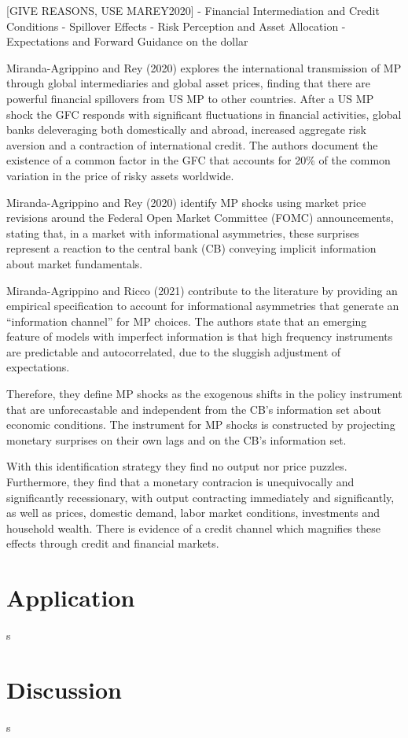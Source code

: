 \documentclass[10pt,a4paper,draft]{article}
\begin{document}
[GIVE REASONS, USE MAREY2020] 
- Financial Intermediation and Credit Conditions
- Spillover Effects
- Risk Perception and Asset Allocation
- Expectations and Forward Guidance on the dollar






Miranda-Agrippino and Rey (2020) explores the international transmission of MP through global intermediaries and global asset prices, finding that there are powerful financial spillovers from US MP to other countries. After a US MP shock the GFC responds with significant fluctuations in financial activities, global banks deleveraging both domestically and abroad, increased aggregate risk aversion and a contraction of international credit. The authors document the existence of a common factor in the GFC that accounts for 20\% of the common variation in the price of risky assets worldwide.

Miranda-Agrippino and Rey (2020) identify MP shocks using market price revisions around the Federal Open Market Committee (FOMC) announcements, stating that, in a market with informational asymmetries, these surprises represent a reaction to the central bank (CB) conveying implicit information about market fundamentals.

    

Miranda-Agrippino and Ricco (2021) contribute to the literature by providing an empirical specification to account for informational asymmetries that generate an \enquote{information channel} for MP choices. The authors state that an emerging feature of models with imperfect information is that high frequency instruments are predictable and autocorrelated, due to the sluggish adjustment of expectations. 

Therefore, they define MP shocks as the exogenous shifts in the policy instrument that are unforecastable and independent from the CB's information set about economic conditions. The instrument for MP shocks is constructed by projecting monetary surprises on their own lags and on the CB's information set. 

With this identification strategy they find no output nor price puzzles. Furthermore, they find that a monetary contracion is unequivocally and significantly recessionary, with output contracting immediately and significantly, as well as prices, domestic demand, labor market conditions, investments and household wealth. There is evidence of a credit channel which magnifies these effects through credit and financial markets. 






\section{Application}
s


\section{Discussion}


s
\end{document}
